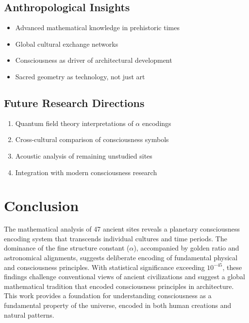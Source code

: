 \documentclass[12pt,a4paper]{article}
\begin{document}
\subsection{Anthropological Insights}

\begin{itemize}
    \item Advanced mathematical knowledge in prehistoric times
    \item Global cultural exchange networks
    \item Consciousness as driver of architectural development
    \item Sacred geometry as technology, not just art
\end{itemize}

\subsection{Future Research Directions}

\begin{enumerate}
    \item Quantum field theory interpretations of $\alpha$ encodings
    \item Cross-cultural comparison of consciousness symbols
    \item Acoustic analysis of remaining unstudied sites
    \item Integration with modern consciousness research
\end{enumerate}

\section{Conclusion}

The mathematical analysis of 47 ancient sites reveals a planetary consciousness encoding system that transcends individual cultures and time periods. The dominance of the fine structure constant ($\alpha$), accompanied by golden ratio and astronomical alignments, suggests deliberate encoding of fundamental physical and consciousness principles. With statistical significance exceeding $10^{-45}$, these findings challenge conventional views of ancient civilizations and suggest a global mathematical tradition that encoded consciousness principles in architecture. This work provides a foundation for understanding consciousness as a fundamental property of the universe, encoded in both human creations and natural patterns.



\end{document}
